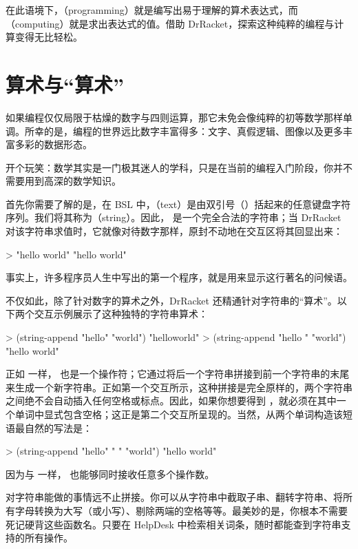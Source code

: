 在此语境下，（programming）就是编写出易于理解的算术表达式，而（computing）就是求出表达式的值。借助 DrRacket，探索这种纯粹的编程与计算变得无比轻松。


\section{算术与“算术”}
\label{sec:prologue:arithmetic}

如果编程仅仅局限于枯燥的数字与四则运算，那它未免会像纯粹的初等数学那样单调。所幸的是，编程的世界远比数字丰富得多：文字、真假逻辑、图像以及更多丰富多彩的数据形态。

\begin{notebox}[幽默旁白]
开个玩笑：数学其实是一门极其迷人的学科，只是在当前的编程入门阶段，你并不需要用到高深的数学知识。
\end{notebox}

首先你需要了解的是，在 BSL 中，（text）是由双引号（）括起来的任意键盘字符序列。我们将其称为（string）。因此， 是一个完全合法的字符串；当 DrRacket 对该字符串求值时，它就像对待数字那样，原封不动地在交互区将其回显出来：
\begin{replbox}
> "hello world"
"hello world"
\end{replbox}
事实上，许多程序员人生中写出的第一个程序，就是用来显示这行著名的问候语。

不仅如此，除了针对数字的算术之外，DrRacket 还精通针对字符串的“算术”。以下两个交互示例展示了这种独特的字符串算术：
\begin{replbox}
> (string-append "hello" "world")
"helloworld"
> (string-append "hello " "world")
"hello world"
\end{replbox}
正如 \code{+} 一样， 也是一个操作符；它通过将后一个字符串拼接到前一个字符串的末尾来生成一个新字符串。正如第一个交互所示，这种拼接是完全原样的，两个字符串之间绝不会自动插入任何空格或标点。因此，如果你想要得到 ，就必须在其中一个单词中显式包含空格；这正是第二个交互所呈现的。当然，从两个单词构造该短语最自然的写法是：
\begin{replbox}
> (string-append "hello" " " "world")
"hello world"
\end{replbox}
因为与 \code{+} 一样， 也能够同时接收任意多个操作数。

对字符串能做的事情远不止拼接。你可以从字符串中截取子串、翻转字符串、将所有字母转换为大写（或小写）、剔除两端的空格等等。最美妙的是，你根本不需要死记硬背这些函数名。只要在 HelpDesk 中检索相关词条，随时都能查到字符串支持的所有操作。

